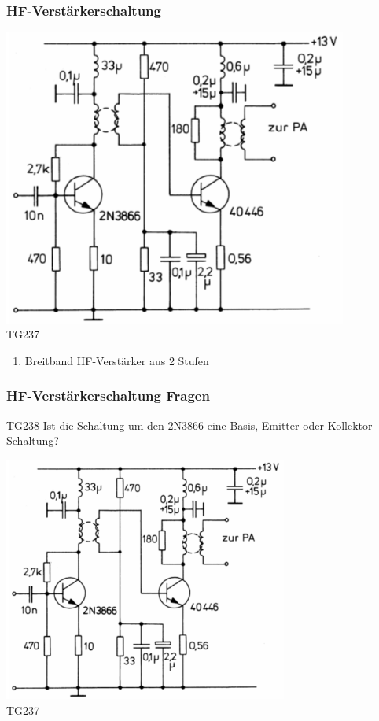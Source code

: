 \begin{frame}
    \frametitle{HF-Verstärkerschaltung}
    \begin{center}
        \includegraphics[width=0.85\textwidth]{a07/TG237.png}\\
        \tiny TG237 \hyperlink{refs}{\cite{bna}}
     	\begin{enumerate} \Large
			\item Breitband HF-Verstärker aus 2 Stufen
    	\end{enumerate}
    \end{center}
\end{frame}

\begin{frame}
    \frametitle{HF-Verstärkerschaltung Fragen}
        \begin{center}
        \begin{block}{TG238} \large
			 Ist die Schaltung um den 2N3866 eine Basis, Emitter oder Kollektor Schaltung?
    	\end{block}
        \includegraphics[width=0.7\textwidth]{a07/TG237.png}\\
        \tiny TG237 \hyperlink{refs}{\cite{bna}}
    \end{center}
\end{frame}

